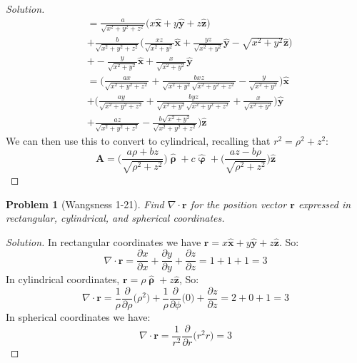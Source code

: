 \documentclass[oneside]{book}
\theoremstyle{mystyle}
\newtheorem{problem}{Problem}[section]
\begin{document}
\begin{proof}[Solution]
\begin{align*}
                &= \frac{a}{\sqrt{x^{2}+y^{2}+z^{2}}}\bigg(x\hat{\mathbf{x}} + y\hat{\mathbf{y}}+z\hat{\mathbf{z}}\bigg)\\
                &+ \frac{b}{\sqrt{x^{2}+y^{2}+z^{2}}}\bigg(\frac{xz}{\sqrt{x^2+y^2}}\hat{\mathbf{x}} + \frac{yz}{\sqrt{x^{2}+y^{2}}}\hat{\mathbf{y}} - \sqrt{x^2+y^2}\hat{\mathbf{z}}\bigg)\\
                &+ -\frac{y}{\sqrt{x^2+y^2}}\hat{\mathbf{x}} + \frac{x}{\sqrt{x^{2}+y^{2}}}\hat{\mathbf{y}}\\
                &= \bigg(\frac{ax}{\sqrt{x^{2}+y^{2}+z^{2}}}+\frac{bxz}{\sqrt{x^2+y^2}\sqrt{x^{2}+y^{2}+z^{2}}} - \frac{y}{\sqrt{x^2+y^2}}\bigg)\hat{\mathbf{x}}\\
                &+\bigg(\frac{ay}{\sqrt{x^{2}+y^{2}+z^{2}}}+\frac{byz}{\sqrt{x^2+y^2}\sqrt{x^{2}+y^{2}+z^{2}}} + \frac{x}{\sqrt{x^{2}+y^{2}}}\bigg)\hat{\mathbf{y}}\\
                &+ \frac{az}{\sqrt{x^{2}+y^{2}+z^{2}}} - \frac{b\sqrt{x^{2}+y^{2}}}{\sqrt{x^{2}+y^{2}+z^{2}}}\bigg)\hat{\mathbf{z}}
\end{align*}
We can then use this to convert to cylindrical, recalling that $r^{2} = \rho^{2}+z^{2}$:
\begin{equation*}
    \mathbf{A} = \bigg(\frac{a\rho+bz}{\sqrt{\rho^2+z^2}}\bigg)\hat{\boldsymbol{\uprho}}+c\hat{\boldsymbol{\upvarphi}}+\bigg(\frac{az-b\rho}{\sqrt{\rho^2+z^2}}\bigg)\hat{\mathbf{z}}
\end{equation*}
\end{proof}
\begin{problem}[Wangsness 1-21]
Find $\nabla\cdot\mathbf{r}$ for the position vector $\mathbf{r}$ expressed in rectangular, cylindrical, and spherical coordinates.
\end{problem}
\begin{proof}[Solution]
In rectangular coordinates we have $\mathbf{r} = x\hat{\mathbf{x}} + y\hat{\mathbf{y}} + z\hat{\mathbf{z}}$. So:
\begin{equation*}
    \nabla\cdot\mathbf{r}=\frac{\partial x}{\partial x}+\frac{\partial y}{\partial y}+\frac{\partial z}{\partial z}=1+1+1= 3
\end{equation*}
In cylindrical coordinates, $\mathbf{r} = \rho\hat{\boldsymbol{\uprho}} + z\hat{\mathbf{z}}$, So:
\begin{equation*}
    \nabla\cdot\mathbf{r}=\frac{1}{\rho}\frac{\partial}{\partial \rho}\big(\rho^2\big)+\frac{1}{\rho}\frac{\partial}{\partial\phi}\big(0\big)+\frac{\partial z}{\partial z}=2+0+1=3
\end{equation*}
In spherical coordinates we have:
\begin{equation*}
    \nabla\cdot\mathbf{r}=\frac{1}{r^2}\frac{\partial}{\partial r}\big(r^2 r\big)=3
\end{equation*}
\end{proof}
\end{document}
